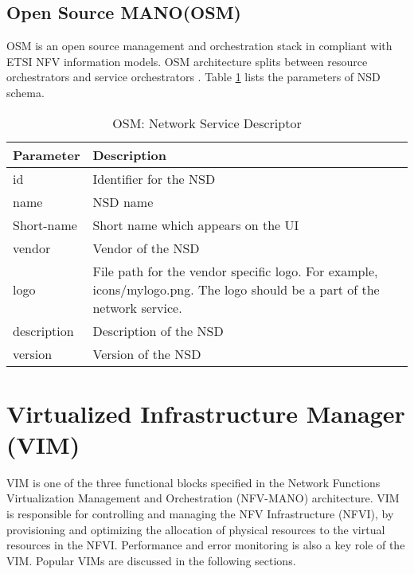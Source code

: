 \subsection{Open Source MANO(OSM)}
\label{SecOSM}
OSM is an open source management and orchestration stack in compliant with ETSI NFV information models. OSM architecture splits between resource orchestrators and service orchestrators \cite{de2018network}. Table \ref{tab:OSM_nsd} lists the parameters of NSD schema. \cite{OSMSchemaDocumentation}
    \begin{table}[h]
        \centering
    \begin{tabular}{ |p{4cm}|p{10cm}|}
        \hline
        \textbf{Parameter} & \textbf{Description} \\
        \hline
         
         id &   Identifier for the NSD \\
         \hline
         name & NSD name \\
         \hline
         Short-name &   Short name which appears on the UI \\
         \hline
         vendor &   Vendor of the NSD \\
         \hline
         logo & File path for the vendor specific logo. For example, icons/mylogo.png. The logo should be a part of the network service. \\
         \hline
         description &  Description of the NSD \\
         \hline
         version &  Version of the NSD \\
         \hline
    \end{tabular}
        \caption{OSM: Network Service Descriptor}
    \label{tab:OSM_nsd}
 \end{table}



\newpage
\section{Virtualized Infrastructure Manager (VIM)}
VIM is one of the three functional blocks specified in the Network Functions Virtualization Management and Orchestration (NFV-MANO) architecture. VIM is responsible for controlling and managing the NFV Infrastructure (NFVI), by provisioning and optimizing the allocation of physical resources to the virtual resources in the NFVI. Performance and error monitoring is also a key role of the VIM. Popular VIMs are discussed in the following sections.
